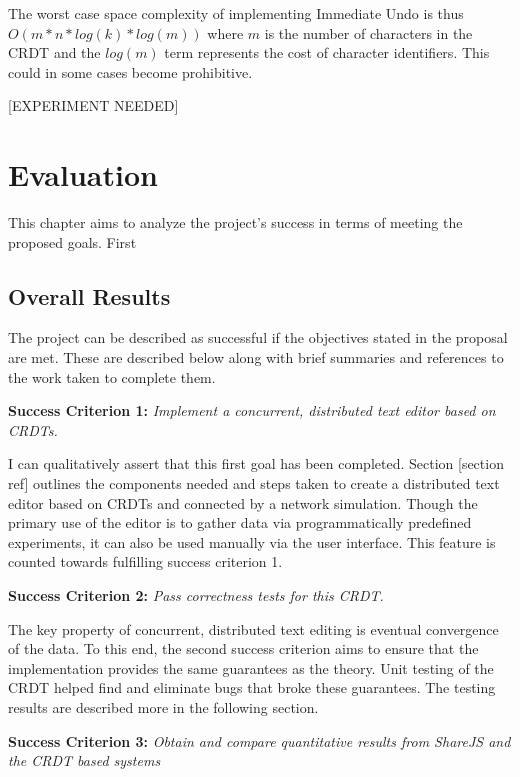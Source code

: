 \documentclass[12pt,a4paper,twoside,openright]{report}
\begin{document}
			The worst case space complexity of implementing Immediate Undo is thus $O(m*n*log(k)*log(m))$ where $m$ is the number of characters in the CRDT and the $log(m)$ term represents the cost of character identifiers. This could in some cases become prohibitive.
			
			[EXPERIMENT NEEDED]
			
			
			
			
		


\chapter{Evaluation}
	This chapter aims to analyze the project's success in terms of meeting the proposed goals. First

	\section{Overall Results}
	
	The project can be described as successful if the objectives stated in the proposal are met. These are described below along with brief summaries and references to the work taken to complete them.
	
	\textbf{Success Criterion 1:} \textit{Implement a concurrent, distributed text editor based on CRDTs.}
	
	I can qualitatively assert that this first goal has been completed. Section [section ref] outlines the components needed and steps taken to create a distributed text editor based on CRDTs and connected by a network simulation. Though the primary use of the editor is to gather data via programmatically predefined experiments, it can also be used manually via the user interface. This feature is counted towards fulfilling success criterion 1.
	
	\textbf{Success Criterion 2:} \textit{Pass correctness tests for this CRDT.}
	
	The key property of concurrent, distributed text editing is eventual convergence of the data. To this end, the second success criterion aims to ensure that the implementation provides the same guarantees as the theory. Unit testing of the CRDT helped find and eliminate bugs that broke these guarantees. The testing results are described more in the following section.
	

	\textbf{Success Criterion 3:} \textit{Obtain and compare quantitative results from ShareJS and the CRDT based systems}
	
\end{document}
